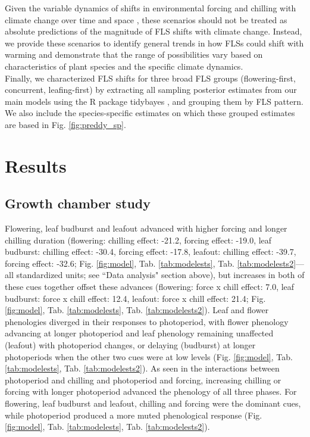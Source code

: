 \documentclass[12pt]{article}\usepackage[]{graphicx}\usepackage[]{color}
\begin{document}
\noindent Given the variable dynamics of shifts in environmental forcing and chilling with climate change over time and space \citep{Luedeling:2011aa}, these scenarios should not be treated as absolute predictions of the magnitude of FLS shifts with climate change. Instead, we provide these scenarios to identify general trends in how FLSs could shift with warming and demonstrate that the range of possibilities vary based on characteristics of plant species and the specific climate dynamics.\\

\noindent Finally, we characterized FLS shifts for three broad FLS groups (flowering-first, concurrent, leafing-first) by extracting all sampling posterior estimates from our main models using the R package tidybayes \citep{Kay2020}, and grouping them by FLS pattern. We also include the species-specific estimates on which these grouped estimates are based in Fig. \ref{fig:preddy_sp}.  \\ 

\section*{Results} 
\subsection*{Growth chamber study} 
\noindent  Flowering, leaf budburst and leafout advanced with higher forcing and longer chilling duration (flowering: chilling effect: -21.2, forcing effect: -19.0, leaf budburst: chilling effect: -30.4, forcing effect: -17.8, leafout: chilling effect: -39.7, forcing effect: -32.6; Fig. \ref{fig:model}, Tab. \ref{tab:modelests}, Tab. \ref{tab:modelests2}---all standardized units; see ``Data analysis" section above), but increases in both of these cues together offset these advances (flowering: force x chill effect: 7.0, leaf budburst: force x chill effect: 12.4, leafout: force x chill effect: 21.4; Fig. \ref{fig:model}, Tab. \ref{tab:modelests}, Tab. \ref{tab:modelests2}). Leaf and flower phenologies diverged in their responses to photoperiod, with flower phenology advancing at longer photoperiod and leaf phenology  remaining unaffected (leafout) with photoperiod changes, or delaying (budburst) at longer photoperiods when the other two cues were at low levels (Fig. \ref{fig:model}, Tab. \ref{tab:modelests}, Tab. \ref{tab:modelests2}). As seen in the interactions between photoperiod and chilling and photoperiod and forcing, increasing chilling or forcing with longer photoperiod advanced the phenology of all three phases. For flowering, leaf budburst and leafout, chilling and forcing were the dominant cues, while photoperiod produced a more muted phenological response (Fig. \ref{fig:model}, Tab. \ref{tab:modelests}, Tab. \ref{tab:modelests2}). \\
\end{document}

